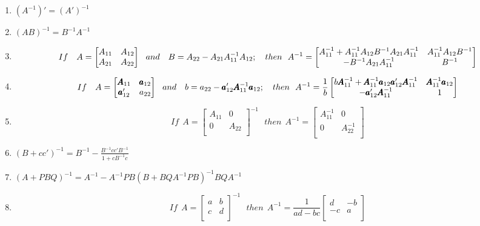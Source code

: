 \documentclass[]{article}
\begin{document}
\begin{enumerate}[1)]
\item $(A^{-1})' = (A')^{-1}$
\item $(AB)^{-1} = B^{-1}A^{-1}$
\item \[ If ~~~A =
\begin{bmatrix}
    A_{11}       & A_{12}  \\
    A_{21}       & A_{22} \\
\end{bmatrix} ~~and
~~~B = A_{22} - A_{21}A_{11}^{-1}A_{12};\\
~~~ then~~A^{-1} =
\begin{bmatrix}
    A_{11}^{-1} + A_{11}^{-1}A_{12}B^{-1}A_{21}A_{11}^{-1}  &  A_{11}^{-1}A_{12}B^{-1} \\
    -B^{-1}A_{21}A_{11}^{-1}       &             B^{-1}
\end{bmatrix}
\]

\item \[ If ~~~A =
\begin{bmatrix}
    \pmb{A}_{11}       & \pmb{a}_{12}  \\
    \pmb{a}_{12}'       & a_{22} \\
\end{bmatrix} ~~and
~~~b = a_{22} - \pmb{a}_{12}'\pmb{A}_{11}^{-1}\pmb{a}_{12};\\
~~~ then~~A^{-1} = \frac{1}{b}
\begin{bmatrix}
    b\pmb{A}_{11}^{-1} + \pmb{A}_{11}^{-1}\pmb{a}_{12}\pmb{a}_{12}'\pmb{A}_{11}^{-1}  &  \pmb{A}_{11}^{-1}\pmb{a}_{12} \\
    -\pmb{a}_{12}'\pmb{A}_{11}^{-1}       &             1
\end{bmatrix}
\]

\item \[If~~ A =
\begin{bmatrix}
    A_{11}       & 0  \\
    0       & A_{22} \\
\end{bmatrix}^{-1}
~~~ then ~~A^{-1}=
\begin{bmatrix}
    A_{11}^{-1}       & 0  \\
    0       & A_{22}^{-1} \\
\end{bmatrix}
\]
 \item $(B+cc')^{-1} = B^{-1} - \frac{B^{-1}cc'B^{-1}}{1 + c B^{-1}c}$
 \item $(A + PBQ)^{-1} = A^{-1} - A^{-1} PB(B+BQA^{-1}PB)^{-1}BQA^{-1}$
\item \[If~~ A =
\begin{bmatrix}
    a       & b  \\
    c       & d \\
\end{bmatrix}^{-1}
~~~ then ~~A^{-1}=\frac{1}{ad-bc}
\begin{bmatrix}
    d       & -b  \\
    -c       & a \\
\end{bmatrix}
\]
\end{enumerate}
\end{document}
